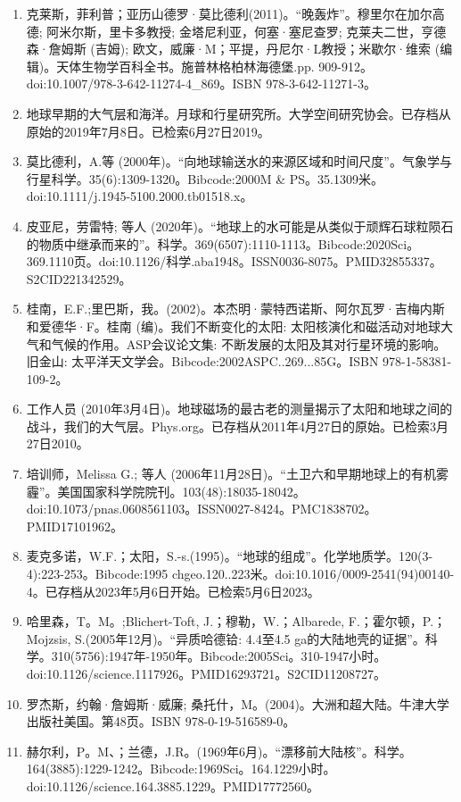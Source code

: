 \begin{enumerate}
\item 克莱斯，菲利普；亚历山德罗·莫比德利(2011)。“晚轰炸”。穆里尔在加尔高德; 阿米尔斯，里卡多教授; 金塔尼利亚，何塞·塞尼查罗; 克莱夫二世，亨德森·詹姆斯 (吉姆); 欧文，威廉·M；平提，丹尼尔·L教授；米歇尔·维索 (编辑)。天体生物学百科全书。施普林格柏林海德堡.pp. 909-912。doi:10.1007/978-3-642-11274-4_869。ISBN 978-3-642-11271-3。
\item 地球早期的大气层和海洋。月球和行星研究所。大学空间研究协会。已存档从原始的2019年7月8日。已检索6月27日2019。
\item 莫比德利，A.等 (2000年)。“向地球输送水的来源区域和时间尺度”。气象学与行星科学。35(6):1309-1320。Bibcode:2000M & PS。35.1309米。doi:10.1111/j.1945-5100.2000.tb01518.x。
\item 皮亚尼，劳雷特; 等人 (2020年)。“地球上的水可能是从类似于顽辉石球粒陨石的物质中继承而来的”。科学。369(6507):1110-1113。Bibcode:2020Sci。369.1110页。doi:10.1126/科学.aba1948。ISSN0036-8075。PMID32855337。S2CID221342529。   
\item 桂南，E.F.;里巴斯，我。(2002)。本杰明·蒙特西诺斯、阿尔瓦罗·吉梅内斯和爱德华·F。桂南 (编)。我们不断变化的太阳: 太阳核演化和磁活动对地球大气和气候的作用。ASP会议论文集: 不断发展的太阳及其对行星环境的影响。旧金山: 太平洋天文学会。Bibcode:2002ASPC..269...85G。ISBN 978-1-58381-109-2。
\item 工作人员 (2010年3月4日)。地球磁场的最古老的测量揭示了太阳和地球之间的战斗，我们的大气层。Phys.org。已存档从2011年4月27日的原始。已检索3月27日2010。
\item 培训师，Melissa G.; 等人 (2006年11月28日)。“土卫六和早期地球上的有机雾霾”。美国国家科学院院刊。103(48):18035-18042。doi:10.1073/pnas.0608561103。ISSN0027-8424。PMC1838702。PMID17101962。   
\item 麦克多诺，W.F.；太阳，S.-s.(1995)。“地球的组成”。化学地质学。120(3-4):223-253。Bibcode:1995 chgeo.120..223米。doi:10.1016/0009-2541(94)00140-4。已存档从2023年5月6日开始。已检索5月6日2023。
\item 哈里森，T。M。;Blichert-Toft, J.；穆勒，W.；Albarede, F.；霍尔顿，P.；Mojzsis, S.(2005年12月)。“异质哈德铪: 4.4至4.5 ga的大陆地壳的证据”。科学。310(5756):1947年-1950年。Bibcode:2005Sci。310-1947小时。doi:10.1126/science.1117926。PMID16293721。S2CID11208727。  
\item 罗杰斯，约翰·詹姆斯·威廉; 桑托什，M。(2004)。大洲和超大陆。牛津大学出版社美国。第48页。ISBN 978-0-19-516589-0。
\item 赫尔利，P。M、；兰德，J.R。(1969年6月)。“漂移前大陆核”。科学。164(3885):1229-1242。Bibcode:1969Sci。164.1229小时。doi:10.1126/science.164.3885.1229。PMID17772560。 

\end{enumerate}

